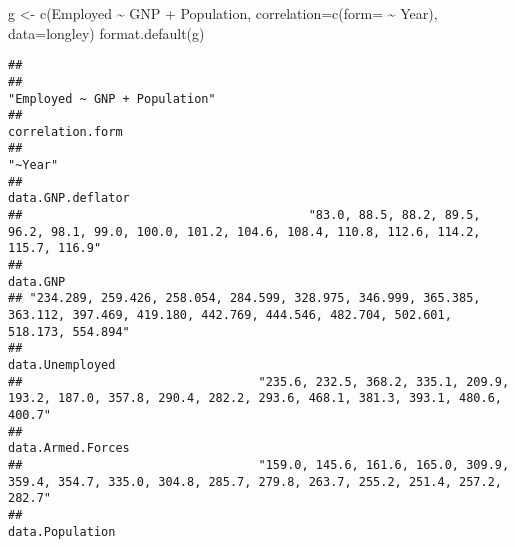 \documentclass[
]{article}
\newenvironment{Shaded}{\begin{snugshade}}{\end{snugshade}}
\newcommand{\AttributeTok}[1]{\textcolor[rgb]{0.77,0.63,0.00}{#1}}
\newcommand{\FunctionTok}[1]{\textcolor[rgb]{0.00,0.00,0.00}{#1}}
\newcommand{\NormalTok}[1]{#1}
\newcommand{\OtherTok}[1]{\textcolor[rgb]{0.56,0.35,0.01}{#1}}
\newcommand{\SpecialCharTok}[1]{\textcolor[rgb]{0.00,0.00,0.00}{#1}}
\begin{document}
\begin{Shaded}
\begin{Highlighting}[]
\NormalTok{g }\OtherTok{\textless{}{-}} \FunctionTok{c}\NormalTok{(Employed }\SpecialCharTok{\textasciitilde{}}\NormalTok{ GNP }\SpecialCharTok{+}\NormalTok{ Population,}
         \AttributeTok{correlation=}\FunctionTok{c}\NormalTok{(}\AttributeTok{form=} \SpecialCharTok{\textasciitilde{}}\NormalTok{ Year), }\AttributeTok{data=}\NormalTok{longley)}
\FunctionTok{format.default}\NormalTok{(g)}
\end{Highlighting}
\end{Shaded}

\begin{verbatim}
##                                                                                                                                                  
##                                                                                                                    "Employed ~ GNP + Population" 
##                                                                                                                                 correlation.form 
##                                                                                                                                          "~Year" 
##                                                                                                                                data.GNP.deflator 
##                                        "83.0, 88.5, 88.2, 89.5, 96.2, 98.1, 99.0, 100.0, 101.2, 104.6, 108.4, 110.8, 112.6, 114.2, 115.7, 116.9" 
##                                                                                                                                         data.GNP 
## "234.289, 259.426, 258.054, 284.599, 328.975, 346.999, 365.385, 363.112, 397.469, 419.180, 442.769, 444.546, 482.704, 502.601, 518.173, 554.894" 
##                                                                                                                                  data.Unemployed 
##                                 "235.6, 232.5, 368.2, 335.1, 209.9, 193.2, 187.0, 357.8, 290.4, 282.2, 293.6, 468.1, 381.3, 393.1, 480.6, 400.7" 
##                                                                                                                                data.Armed.Forces 
##                                 "159.0, 145.6, 161.6, 165.0, 309.9, 359.4, 354.7, 335.0, 304.8, 285.7, 279.8, 263.7, 255.2, 251.4, 257.2, 282.7" 
##                                                                                                                                  data.Population 

\end{verbatim}
\end{document}
